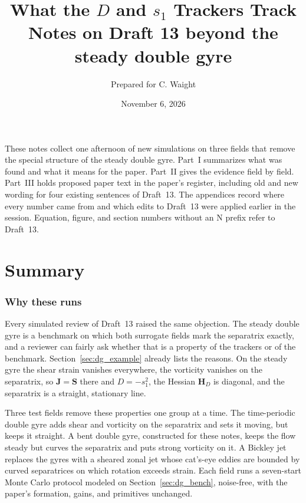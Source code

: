 \documentclass[11pt]{article}
\title{What the $D$ and $s_1$ Trackers Track\\[2pt]
\large Notes on Draft 13 beyond the steady double gyre}
\author{Prepared for C. Waight}
\date{November 6, 2026}
\begin{document}
\maketitle

\noindent These notes collect one afternoon of new simulations on three
fields that remove the special structure of the steady double gyre. Part~I
summarizes what was found and what it means for the paper. Part~II gives
the evidence field by field. Part~III holds proposed paper text in the
paper's register, including old and new wording for four existing
sentences of Draft~13. The appendices record where every number came
from and which edits to Draft~13 were applied earlier in the session.
Equation, figure, and section numbers without an N prefix refer to
Draft~13.

\tableofcontents

\part{Summary}

\section{Why these runs}

Every simulated review of Draft~13 raised the same objection. The steady
double gyre is a benchmark on which both surrogate fields mark the
separatrix exactly, and a reviewer can fairly ask whether that is a
property of the trackers or of the benchmark. Section~\ref{sec:dg_example}
already lists the reasons. On the steady gyre the shear strain vanishes
everywhere, the vorticity vanishes on the separatrix, so
$\mathbf{J} = \mathbf{S}$ there and $D = -s_1^2$, the Hessian
$\mathbf{H}_D$ is diagonal, and the separatrix is a straight, stationary
line.

Three test fields remove these properties one group at a time. The
time-periodic double gyre adds shear and vorticity on the separatrix and
sets it moving, but keeps it straight. A bent double gyre, constructed for
these notes, keeps the flow steady but curves the separatrix and puts
strong vorticity on it. A Bickley jet replaces the gyres with a sheared
zonal jet whose cat's-eye eddies are bounded by curved separatrices on
which rotation exceeds strain. Each field runs a seven-start Monte
Carlo protocol modeled on Section~\ref{sec:dg_bench}, noise-free, with the
paper's formation, gains, and primitives unchanged.
\end{document}
